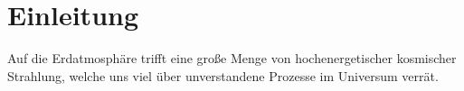 \chapter{Einleitung}

Auf die Erdatmosphäre trifft eine große Menge von hochenergetischer kosmischer Strahlung, welche uns viel über unverstandene
Prozesse im Universum verrät.